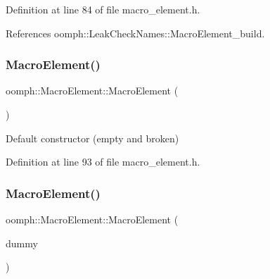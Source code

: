 Definition at line 84 of file macro\+\_\+element.\+h.



References oomph\+::\+Leak\+Check\+Names\+::\+Macro\+Element\+\_\+build.

\mbox{\label{classoomph_1_1MacroElement_affaa1d2975bac834846195c710d86760}} 
\subsubsection{\texorpdfstring{Macro\+Element()}{MacroElement()}\hspace{0.1cm}{\footnotesize\ttfamily [2/3]}}
{\footnotesize\ttfamily oomph\+::\+Macro\+Element\+::\+Macro\+Element (\begin{DoxyParamCaption}{ }\end{DoxyParamCaption})\hspace{0.3cm}{\ttfamily [inline]}}



Default constructor (empty and broken) 



Definition at line 93 of file macro\+\_\+element.\+h.

\mbox{\label{classoomph_1_1MacroElement_a56dbe3369ce703354a63968146665615}} 
\subsubsection{\texorpdfstring{Macro\+Element()}{MacroElement()}\hspace{0.1cm}{\footnotesize\ttfamily [3/3]}}
{\footnotesize\ttfamily oomph\+::\+Macro\+Element\+::\+Macro\+Element (\begin{DoxyParamCaption}\item[{const \hyperlink{classoomph_1_1MacroElement}{Macro\+Element} \&}]{dummy }\end{DoxyParamCaption})\hspace{0.3cm}{\ttfamily [inline]}}



